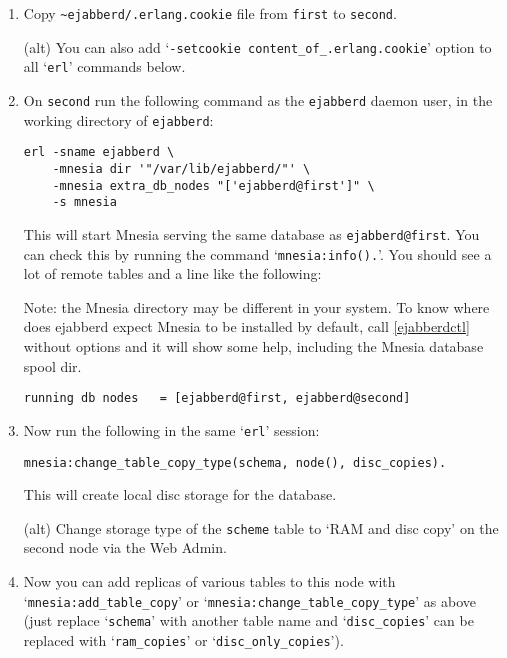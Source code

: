 \documentclass[a4paper,10pt]{book}
\newcommand{\node}[1]{\texttt{#1}}
\newcommand{\term}[1]{\texttt{#1}}
\newcommand{\shell}[1]{\texttt{#1}}
\newcommand{\ejabberd}{\texttt{ejabberd}}
\begin{document}
\begin{enumerate}
\item Copy \verb|~ejabberd/.erlang.cookie| file from \term{first} to
  \term{second}.

  (alt) You can also add `\verb|-setcookie content_of_.erlang.cookie|'
  option to all `\shell{erl}' commands below.

\item On \term{second} run the following command as the \ejabberd{} daemon user,
  in the working directory of \ejabberd{}:

\begin{verbatim}
erl -sname ejabberd \
    -mnesia dir '"/var/lib/ejabberd/"' \
    -mnesia extra_db_nodes "['ejabberd@first']" \
    -s mnesia
\end{verbatim}

  This will start Mnesia serving the same database as \node{ejabberd@first}.
  You can check this by running the command `\verb|mnesia:info().|'. You
  should see a lot of remote tables and a line like the following:

  Note: the Mnesia directory may be different in your system.
  To know where does ejabberd expect Mnesia to be installed by default,
  call \ref{ejabberdctl} without options and it will show some help,
  including the Mnesia database spool dir.

\begin{verbatim}
running db nodes   = [ejabberd@first, ejabberd@second]
\end{verbatim}


\item Now run the following in the same `\shell{erl}' session:

\begin{verbatim}
mnesia:change_table_copy_type(schema, node(), disc_copies).
\end{verbatim}

  This will create local disc storage for the database.

  (alt) Change storage type of the \term{scheme} table to `RAM and disc
  copy' on the second node via the Web Admin.


\item Now you can add replicas of various tables to this node with
  `\verb|mnesia:add_table_copy|' or
  `\verb|mnesia:change_table_copy_type|' as above (just replace
  `\verb|schema|' with another table name and `\verb|disc_copies|'
  can be replaced with `\verb|ram_copies|' or
  `\verb|disc_only_copies|').


\end{enumerate}
\end{document}
